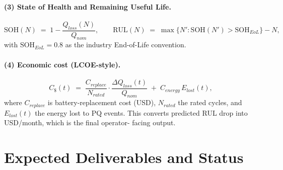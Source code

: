 \documentclass[11pt,a4paper]{article}
\begin{document}
\paragraph{(3) State of Health and Remaining Useful Life.}
\begin{equation}
    \mathrm{SOH}(N) \;=\; 1 - \frac{Q_{loss}(N)}{Q_{nom}},
    \qquad
    \mathrm{RUL}(N) \;=\; \max\bigl\{N' : \mathrm{SOH}(N') > \mathrm{SOH}_{EoL}\bigr\} - N,
\end{equation}
with $\mathrm{SOH}_{EoL}=0.8$ as the industry End-of-Life convention.

\paragraph{(4) Economic cost (LCOE-style).}
\begin{equation}
    C_{\$}(t) \;=\;
        \frac{C_{replace}}{N_{rated}} \cdot \frac{\Delta Q_{loss}(t)}{Q_{nom}}
        \;+\; C_{energy}\, E_{lost}(t),
\end{equation}
where $C_{replace}$ is battery-replacement cost (USD), $N_{rated}$ the
rated cycles, and $E_{lost}(t)$ the energy lost to PQ events. This
converts predicted RUL drop into USD/month, which is the final operator-
facing output.

\section{Expected Deliverables and Status}
\end{document}

